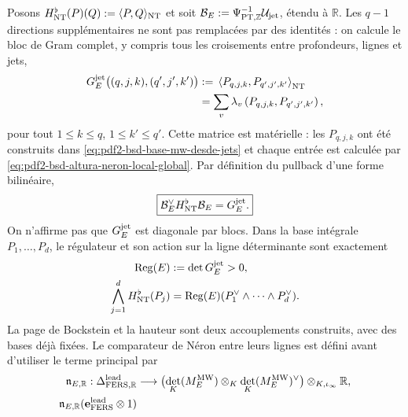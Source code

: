 \begin{proposition}
Posons
$H_{\rm NT}^{\flat}(P)(Q):=\langle P,Q\rangle_{\rm NT}$ et soit
$\mathcal B_E:=\Psi_{{\rm PT},\mathbb Z}^{-1}\mathcal U_{\rm jet}$,
étendu à $\mathbb R$. Les $q-1$ directions supplémentaires ne sont pas remplacées
par des identités : on calcule le bloc de Gram complet, y compris tous les
croisements entre profondeurs, lignes et jets,
\begin{equation}\label{eq:pdf2-bsd-gram-jet-completo}
 \begin{aligned}
 G_E^{\rm jet}\bigl((q,j,k),(q',j',k')\bigr)
 &:={}
 \left\langle P_{q,j,k},P_{q',j',k'}\right\rangle_{\rm NT}\\
 &=\sum_v\lambda_v
   \left(P_{q,j,k},P_{q',j',k'}\right),
 \end{aligned}
\end{equation}
pour tout $1\le k\le q$, $1\le k'\le q'$. Cette matrice est matérielle : les
$P_{q,j,k}$ ont été construits dans
\eqref{eq:pdf2-bsd-base-mw-desde-jets} et chaque entrée est calculée par
\eqref{eq:pdf2-bsd-altura-neron-local-global}. Par définition du pullback
d'une forme bilinéaire,
\begin{equation}\label{eq:pdf2-bsd-altura-nt-generadores}
 \boxed{
 \mathcal B_E^\vee H_{\rm NT}^{\flat}\mathcal B_E=G_E^{\rm jet}.}
\end{equation}
On n'affirme pas que $G_E^{\rm jet}$ est diagonale par blocs. Dans la base
intégrale $P_1,\ldots,P_d$, le régulateur et son action sur la ligne déterminante
sont exactement
\begin{equation}\label{eq:pdf2-bsd-regulador-cuna-altura}
 \begin{aligned}
 \operatorname{Reg}(E)&:=\det G_E^{\rm jet}>0,\\
 \bigwedge_{j=1}^dH_{\rm NT}^{\flat}(P_j)
 &=\operatorname{Reg}(E)
   (P_1^\vee\wedge\cdots\wedge P_d^\vee).
 \end{aligned}
\end{equation}
La page de Bockstein et la hauteur sont deux accouplements construits, avec des
bases déjà fixées. Le comparateur de Néron entre leurs lignes est défini avant
d'utiliser le terme principal par
\begin{equation}\label{eq:pdf2-bsd-comparador-neron-jet}
 \begin{aligned}
 \mathfrak n_{E,\mathbb R}:
 \Delta_{{\rm FERS},\mathbb R}^{\rm lead}&\longrightarrow
 \bigl(\det_K(M_E^{\rm MW})\otimes_K
 \det_K(M_E^{\rm MW})^\vee\bigr)\otimes_{K,\iota_\infty}\mathbb R,\\
 \mathfrak n_{E,\mathbb R}
 (\mathbf e_{\rm FERS}^{\rm lead}\otimes1)

\end{aligned}
\end{equation}
\end{proposition}
